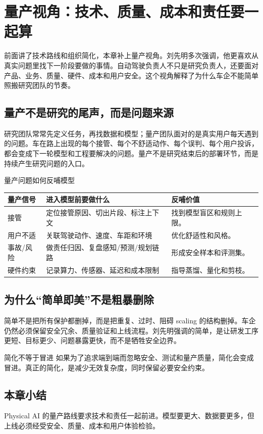 \section{量产视角：技术、质量、成本和责任要一起算}

前面讲了技术路线和组织简化，本章补上量产视角。刘先明多次强调，他更喜欢从真实问题里找下一阶段要做的事情。自动驾驶负责人不只是研究负责人，还要面对产品、业务、质量、硬件、成本和用户安全。这个视角解释了为什么车企不能简单照搬研究团队的节奏。

\subsection{量产不是研究的尾声，而是问题来源}

研究团队常常先定义任务，再找数据和模型；量产团队面对的是真实用户每天遇到的问题。车在路上出现的每个接管、每个不舒适动作、每个误判、每个用户投诉，都会变成下一轮模型和工程要解决的问题。量产不是研究结束后的部署环节，而是持续产生研究问题的入口。

\begin{knowledgebox}{量产问题如何反哺模型}
\begin{tabularx}{\textwidth}{p{}p{}X}
\toprule
量产信号 & 进入模型前要做什么 & 反哺价值 \\
\midrule
接管 & 定位接管原因、切出片段、标注上下文 & 找到模型盲区和规则上限。 \\
用户不适 & 关联驾驶动作、速度、车距和环境 & 优化舒适性和风格。 \\
事故/风险 & 做责任归因、复盘感知/预测/规划链路 & 形成安全样本和评测集。 \\
硬件约束 & 记录算力、传感器、延迟和成本限制 & 指导蒸馏、量化和剪枝。 \\
\bottomrule
\end{tabularx}
\end{knowledgebox}

\subsection{为什么“简单即美”不是粗暴删除}

简单不是把所有保护都删掉，而是把重复、过时、阻碍 scaling 的结构删掉。车企仍然必须保留安全冗余、质量验证和上线流程。刘先明强调的简单，是让研发工序更短、目标更少、问题暴露更快，而不是牺牲安全边界。

\begin{warningbox}{简化不等于冒进}
如果为了追求端到端而忽略安全、测试和量产质量，简化会变成冒进。真正的简化，是减少无效复杂度，同时保留必要安全约束。
\end{warningbox}

\subsection{本章小结}

Physical AI 的量产路线要求技术和责任一起前进。模型要更大、数据要更多，但上线必须经受安全、质量、成本和用户体验检验。

